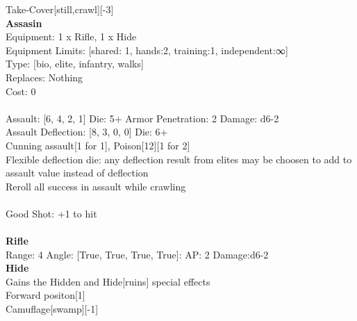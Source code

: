 \noindent Take-Cover[still,crawl][-3]\\ 


{\bf Assasin } \\
Equipment: 1 x Rifle, 1 x Hide \\
Equipment Limits: [shared: 1, hands:2, training:1, independent:∞] \\
Type: [bio, elite, infantry, walks] \\
Replaces: Nothing \\
Cost: 0\\
\ \\
Assault: [6, 4, 2, 1] Die: 5+ Armor Penetration: 2 Damage: d6-2 \\
Assault Deflection: [8, 3, 0, 0] Die: 6+\\
\indent Cunning assault[1 for 1], Poison[12][1 for 2]\\ 
Flexible deflection die: any deflection result from elites may be choosen to add to assault value instead of deflection\\ 
Reroll all success in assault while crawling\\ 
 
\ \\
Good Shot: +1 to hit\\ 

\ \\
{\bf Rifle } \\



Range: 4  Angle: [True, True, True, True]: AP: 2 Damage:d6-2 \\




{\bf Hide } \\

Gains the Hidden and Hide[ruins] special effects\\ 
Forward positon[1]\\ 
Camuflage[swamp][-1]\\ 





 
\ \\



